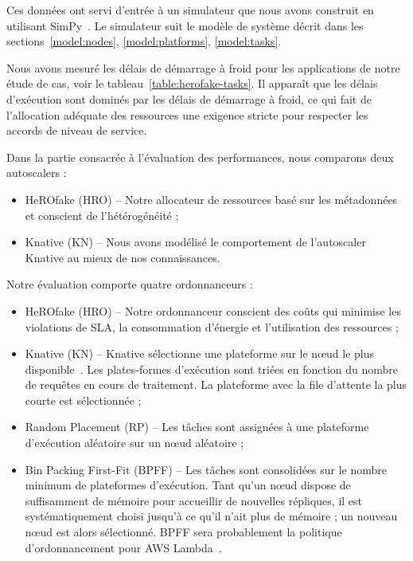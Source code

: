 Ces données ont servi d'entrée à un simulateur que nous avons construit en utilisant SimPy~\cite{simpy}. Le simulateur suit le modèle de système décrit dans les sections~\ref{model:nodes}, \ref{model:platforms}, \ref{model:tasks}.

Nous avons mesuré les délais de démarrage à froid pour les applications de notre étude de cas, voir le tableau~\ref{table:herofake-tasks}. Il apparaît que les délais d'exécution sont dominés par les délais de démarrage à froid, ce qui fait de l'allocation adéquate des ressources une exigence stricte pour respecter les accords de niveau de service.

Dans la partie consacrée à l'évaluation des performances, nous comparons deux autoscalers :

\begin{itemize}
    \item HeROfake (HRO) -- Notre allocateur de ressources basé sur les métadonnées et conscient de l'hétérogénéité ;
    \item Knative (KN) -- Nous avons modélisé le comportement de l'autoscaler Knative au mieux de nos connaissances.
\end{itemize}

Notre évaluation comporte quatre ordonnanceurs :

\begin{itemize}
    \item HeROfake (HRO) -- Notre ordonnanceur conscient des coûts qui minimise les violations de SLA, la consommation d'énergie et l'utilisation des ressources ;
    \item Knative (KN) -- Knative sélectionne une plateforme sur le nœud le plus disponible~\cite{sureshENSUREEfficientScheduling2020}. Les plates-formes d'exécution sont triées en fonction du nombre de requêtes en cours de traitement. La plateforme avec la file d'attente la plus courte est sélectionnée ;
    \item Random Placement (RP) -- Les tâches sont assignées à une plateforme d'exécution aléatoire sur un nœud aléatoire ;
    \item Bin Packing First-Fit (BPFF) -- Les tâches sont consolidées sur le nombre minimum de plateformes d'exécution. Tant qu'un nœud dispose de suffisamment de mémoire pour accueillir de nouvelles répliques, il est systématiquement choisi jusqu'à ce qu'il n'ait plus de mémoire ; un nouveau nœud est alors sélectionné. BPFF sera probablement la politique d'ordonnancement pour AWS Lambda~\cite{wangPeekingCurtainsServerlessb}.
\end{itemize}

